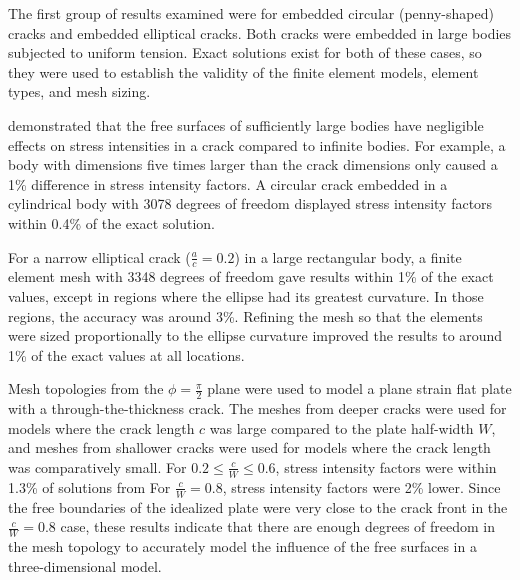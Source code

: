 The first group of results examined were for embedded circular (penny-shaped) cracks and embedded elliptical cracks. Both cracks were embedded in large bodies subjected to uniform tension. Exact solutions exist for both of these cases, so they were used to establish the validity of the finite element models, element types, and mesh sizing.

\citet{tadaparisirwin1973} demonstrated that the free surfaces of sufficiently large bodies have negligible effects on stress intensities in a crack compared to infinite bodies. For example, a body with dimensions five times larger than the crack dimensions only caused a 1\% difference in stress intensity factors. A circular crack embedded in a cylindrical body with 3078 degrees of freedom displayed stress intensity factors within 0.4\% of the exact solution.

For a narrow elliptical crack ($\frac{a}{c}=0.2$) in a large rectangular body, a finite element mesh with 3348 degrees of freedom gave results within 1\% of the exact values, except in regions where the ellipse had its greatest curvature. In those regions, the accuracy was around 3\%. Refining the mesh so that the elements were sized proportionally to the ellipse curvature improved the results to around 1\% of the exact values at all locations.

Mesh topologies from the $\phi=\frac{\pi}{2}$ plane were used to model a plane strain flat plate with a through-the-thickness crack.
The meshes from deeper cracks were used for models where the crack length $c$ was large compared to the plate half-width \(W\), and meshes from shallower cracks were used for models where the crack length was comparatively small.
For $0.2 \leq \frac{c}{W} \leq 0.6$, stress intensity factors were within 1.3\% of solutions from \citeauthor{tadaparisirwin1973}
For $\frac{c}{W} = 0.8$, stress intensity factors were 2\% lower.
Since the free boundaries of the idealized plate were very close to the crack front in the $\frac{c}{W}=0.8$ case, these results indicate that there are enough degrees of freedom in the mesh topology to accurately model the influence of the free surfaces in a three-dimensional model.

